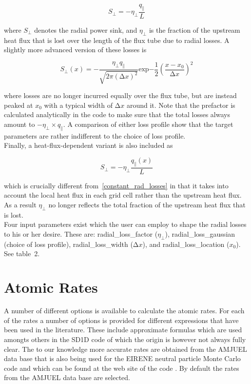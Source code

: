 \documentclass[amsmath,amssymb,a4]{revtex4-2}
\begin{document}
\begin{equation}
\label{constant_rad_losses}
S_{\perp}=-\eta_{\perp}\frac{q_\parallel}{L}
\end{equation}

where $S_{\perp}$ denotes the radial power sink, and $\eta_{\perp}$ is the fraction of the upstream heat flux that is lost over the length of the flux tube due to radial losses. A slightly more advanced version of these losses is

\begin{equation}
S_\perp(x)=-\frac{\eta_{\perp}q_{\parallel}}{\sqrt{2\pi(\mathrm{\Delta}x)^2}}
\mathrm{exp}{-\frac{1}{2}\left(\frac{x-x_0}{\mathrm{\Delta}x}\right)^2}
\end{equation}

where losses are no longer incurred equally over the flux tube, but are instead peaked at $x_0$ with a typical width of $\mathrm{\Delta}x$ around it. Note that the prefactor is calculated analytically in the code to make sure that the total losses always amount to $-\eta_{\perp}\times q_{\parallel}$. A comparison of either loss profile show that the target parameters are rather indifferent to the choice of loss profile.\\

Finally, a heat-flux-dependent variant is also included as

\begin{equation}
S_{\perp}=-\eta_{\perp}\frac{q_\parallel(x)}{L}
\end{equation}

which is crucially different from~\ref{constant_rad_losses} in that it takes into account the local heat flux in each grid cell rather than the upstream heat flux. As a result $\eta_{\perp}$ no longer reflects the total fraction of the upstream heat flux that is lost.\\

Four input parameters exist which the user can employ to shape the radial losses to his or her desire. These are: 
radial\_loss\_factor ($\eta_{\perp}$),
radial\_loss\_gaussian (choice of loss profile),
radial\_loss\_width ($\mathrm{\Delta}x$), and
radial\_loss\_location ($x_0$). See table~2.

\section{Atomic Rates}\label{rates}

A number of different options is available to calculate the atomic rates. For each of the rates a number of options is provided for different expressions that have been used in the literature. These include approximate formulas which are used amongts others in the SD1D code \cite{SD1D} of which the origin is however not always fully clear. The to our knowledge more accurate rates are obtained from the AMJUEL data base that is also being used for the EIRENE neutral particle Monte Carlo code and which can be found at the web site of the code \cite{EIRENE}. By default the rates from the AMJUEL data base are selected.
\end{document}
